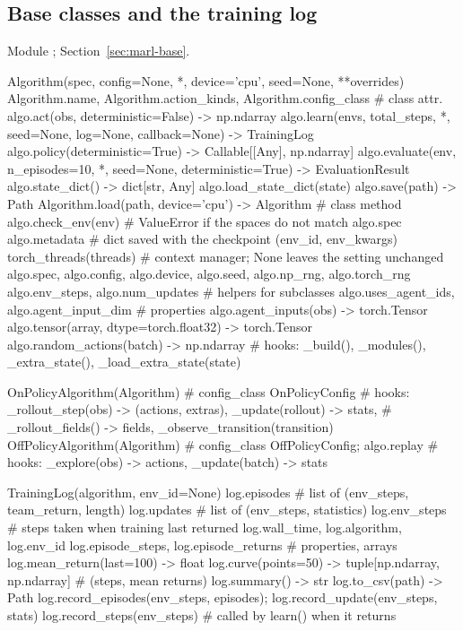 \subsection{Base classes and the training log}

Module ; Section~\ref{sec:marl-base}.

\begin{pycode}
Algorithm(spec, config=None, *, device='cpu', seed=None, **overrides)
Algorithm.name, Algorithm.action_kinds, Algorithm.config_class  # class attr.
algo.act(obs, deterministic=False) -> np.ndarray
algo.learn(envs, total_steps, *, seed=None, log=None,
           callback=None) -> TrainingLog
algo.policy(deterministic=True) -> Callable[[Any], np.ndarray]
algo.evaluate(env, n_episodes=10, *, seed=None,
              deterministic=True) -> EvaluationResult
algo.state_dict() -> dict[str, Any]
algo.load_state_dict(state)
algo.save(path) -> Path
Algorithm.load(path, device='cpu') -> Algorithm        # class method
algo.check_env(env)       # ValueError if the spaces do not match algo.spec
algo.metadata             # dict saved with the checkpoint (env_id, env_kwargs)
torch_threads(threads)    # context manager; None leaves the setting unchanged
algo.spec, algo.config, algo.device, algo.seed, algo.np_rng, algo.torch_rng
algo.env_steps, algo.num_updates
# helpers for subclasses
algo.uses_agent_ids, algo.agent_input_dim              # properties
algo.agent_inputs(obs) -> torch.Tensor
algo.tensor(array, dtype=torch.float32) -> torch.Tensor
algo.random_actions(batch) -> np.ndarray
# hooks: _build(), _modules(), _extra_state(), _load_extra_state(state)

OnPolicyAlgorithm(Algorithm)     # config_class OnPolicyConfig
# hooks: _rollout_step(obs) -> (actions, extras), _update(rollout) -> stats,
#        _rollout_fields() -> fields, _observe_transition(transition)
OffPolicyAlgorithm(Algorithm)    # config_class OffPolicyConfig; algo.replay
# hooks: _explore(obs) -> actions, _update(batch) -> stats

TrainingLog(algorithm, env_id=None)
log.episodes              # list of (env_steps, team_return, length)
log.updates               # list of (env_steps, statistics)
log.env_steps             # steps taken when training last returned
log.wall_time, log.algorithm, log.env_id
log.episode_steps, log.episode_returns                 # properties, arrays
log.mean_return(last=100) -> float
log.curve(points=50) -> tuple[np.ndarray, np.ndarray]  # (steps, mean returns)
log.summary() -> str
log.to_csv(path) -> Path
log.record_episodes(env_steps, episodes); log.record_update(env_steps, stats)
log.record_steps(env_steps)      # called by learn() when it returns
\end{pycode}

